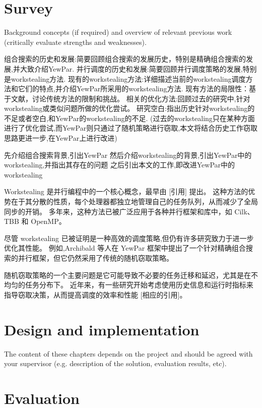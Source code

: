 \documentclass{mproj}
\begin{document}
\chapter{Survey}\label{survey}

Background concepts (if required) and overview of relevant previous work (critically evaluate strengths and weaknesses).


组合搜索的历史和发展:简要回顾组合搜索的发展历史，特别是精确组合搜索的发展,并大致介绍YewPar.
并行调度的历史和发展:简要回顾并行调度策略的发展,特别是workstealing方法.
现有的workstealing方法:详细描述当前的workstealing调度方法和它们的特点,并介绍YewPar所采用的workstealing方法.
现有方法的局限性：基于文献，讨论传统方法的限制和挑战。
相关的优化方法:回顾过去的研究中,针对workstealing或类似问题所做的优化尝试。
研究空白:指出历史针对workstealing的不足或者空白,和YewPar的workstealing的不足.
(过去的workstealing只在某种方面进行了优化尝试,而YewPar则只通过了随机策略进行窃取,本文将结合历史工作窃取思路更进一步,在YewPar上进行改进)

先介绍组合搜索背景,引出YewPar
然后介绍workstealing的背景,引出YewPar中的workstealing,并指出其存在的问题
之后引出本文的工作,即改进YewPar中的workstealing

Workstealing 是并行编程中的一个核心概念，最早由 [引用] 提出。
这种方法的优势在于其分散的性质，每个处理器都独立地管理自己的任务队列，从而减少了全局同步的开销。
多年来，这种方法已被广泛应用于各种并行框架和库中，如 Cilk、TBB 和 OpenMP。

尽管 workstealing 已被证明是一种高效的调度策略,但仍有许多研究致力于进一步优化其性能。
例如,Archibald 等人在 YewPar 框架中提出了一个针对精确组合搜索的并行框架，但它仍然采用了传统的随机窃取策略。

随机窃取策略的一个主要问题是它可能导致不必要的任务迁移和延迟，尤其是在不均匀的任务分布下。
近年来，有一些研究开始考虑使用历史信息和运行时指标来指导窃取决策，从而提高调度的效率和性能 [相应的引用]。

\chapter{Design and implementation}

The content of these chapters depends on the project and should be agreed with your supervisor (e.g. description of the solution, evaluation results, etc).

\chapter{Evaluation}
\end{document}
